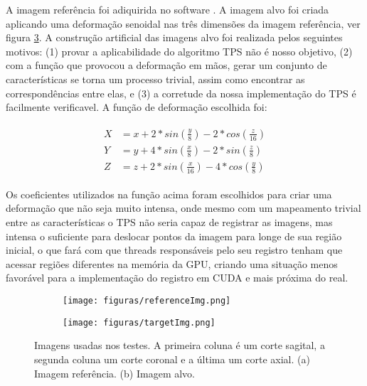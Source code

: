   A imagem referência foi adiquirida no software \cite{papademetris2005bioimage}.
A imagem alvo foi criada aplicando uma deformação senoidal nas três dimensões da
imagem referência, ver figura \ref{fig:testImg}. A construção artificial das
imagens alvo foi realizada pelos seguintes motivos: (1) provar a aplicabilidade
do algoritmo TPS não é nosso objetivo, (2) com a função que provocou a
deformação em mãos, gerar um conjunto de características se torna um processo
trivial, assim como encontrar as correspondências entre elas, e (3) a corretude
da nossa implementação do TPS é facilmente verificavel. A função de deformação
escolhida foi:

\begin{align} \label{math:composta}
\begin{split}
  X &= x + 2*sin(\frac{y}{8}) - 2*cos(\frac{z}{16}) \\
  Y &= y + 4*sin(\frac{x}{8}) - 2*sin(\frac{z}{8}) \\
  Z &= z + 2*sin(\frac{x}{16}) - 4*cos(\frac{y}{8})
\end{split}
\end{align}

  Os coeficientes utilizados na função acima foram escolhidos para criar uma
deformação que não seja muito intensa, onde mesmo com um mapeamento trivial
entre as características o TPS não seria capaz de registrar as imagens, mas
intensa o suficiente para deslocar pontos da imagem para longe de sua região
inicial, o que fará com que threads responsáveis pelo seu registro tenham que
acessar regiões diferentes na memória da GPU, criando uma situação menos
favorável para a implementação do registro em CUDA e mais próxima do real.

\begin{figure}[H]
    \centering
    \begin{subfigure}[t]{0.8\textwidth}
      \texttt{[image: figuras/referenceImg.png]}
      \label{fig:refImg}
    \end{subfigure}
    \begin{subfigure}[t]{0.8\textwidth}
      \texttt{[image: figuras/targetImg.png]}
      \label{fig:tarImg}
    \end{subfigure}
    \caption{Imagens usadas nos testes. A primeira coluna é um corte sagital,
             a segunda coluna um corte coronal e a última um corte axial.
             (a) Imagem referência. (b) Imagem alvo.}
    \label{fig:testImg}
\end{figure}

